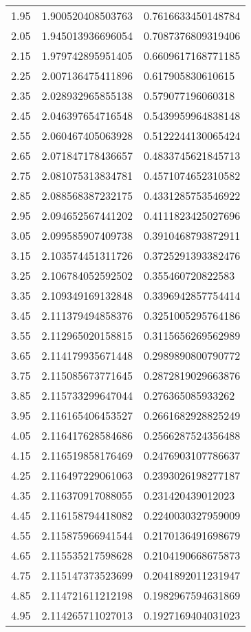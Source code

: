 \begin{longtable}{cll}
    1.95&	1.900520408503763&  0.7616633450148784\\
    2.05&	1.945013936696054&  0.7087376809319406\\
    2.15&	1.979742895951405&  0.6609617168771185\\
    2.25&	2.007136475411896&  0.617905830610615\\
    2.35&	2.028932965855138&  0.579077196060318\\
    2.45&	2.046397654716548&  0.5439959964838148\\
    2.55&	2.060467405063928&  0.5122244130065424\\
    2.65&	2.071847178436657&  0.4833745621845713\\
    2.75&	2.081075313834781&  0.4571074652310582\\
    2.85&	2.088568387232175&  0.4331285753546922\\
    2.95&	2.094652567441202&  0.4111823425027696\\
    3.05&	2.099585907409738&  0.3910468793872911\\
    3.15&	2.103574451311726&  0.3725291393382476\\
    3.25&	2.106784052592502&  0.355460720822583\\
    3.35&	2.109349169132848&  0.3396942857754414\\
    3.45&	2.111379494858376&  0.3251005295764186\\
    3.55&	2.112965020158815&  0.3115656269562989\\
    3.65&	2.114179935671448&  0.2989890800790772\\
    3.75&	2.115085673771645&  0.2872819029663876\\
    3.85&	2.115733299647044&  0.276365085933262\\
    3.95&	2.116165406453527&  0.2661682928825249\\
    4.05&	2.116417628584686&  0.2566287524356488\\
    4.15&	2.116519858176469&  0.2476903107786637\\
    4.25&	2.116497229061063&  0.2393026198277187\\
    4.35&	2.116370917088055&  0.231420439012023\\
    4.45&	2.116158794418082&  0.2240030327959009\\
    4.55&	2.115875966941544&  0.2170136491698679\\
    4.65&	2.115535217598628&  0.2104190668675873\\
    4.75&	2.115147373523699&  0.2041892011231947\\
    4.85&	2.114721611212198&  0.1982967594631869\\
    4.95&	2.114265711027013&  0.1927169404031023\\
\end{longtable}

